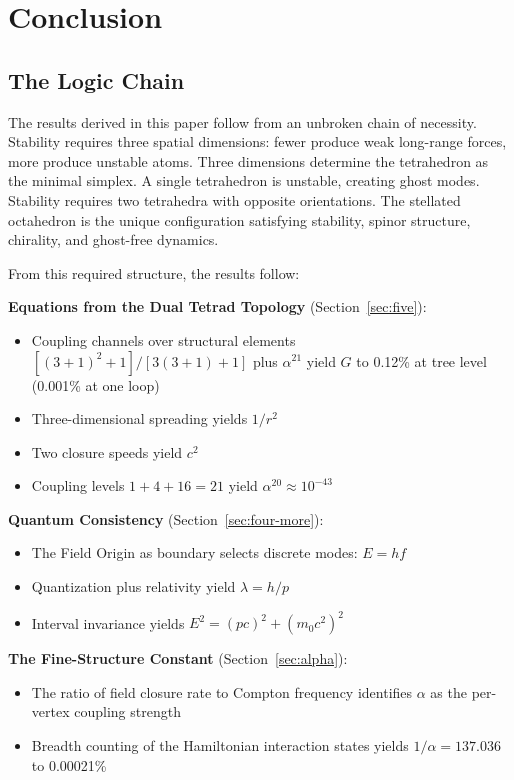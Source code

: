 \documentclass[aps,prd,preprint,superscriptaddress,showpacs,preprintnumbers,amsmath,amssymb,nofootinbib]{revtex4-2}
\begin{document}
\section{Conclusion}
\label{sec:conclusion}

\subsection{The Logic Chain}
\label{subsec:chain}

The results derived in this paper follow from an unbroken chain of necessity. Stability requires three spatial dimensions: fewer produce weak long-range forces, more produce unstable atoms. Three dimensions determine the tetrahedron as the minimal simplex. A single tetrahedron is unstable, creating ghost modes. Stability requires two tetrahedra with opposite orientations. The stellated octahedron is the unique configuration satisfying stability, spinor structure, chirality, and ghost-free dynamics.

From this required structure, the results follow:

\textbf{Equations from the Dual Tetrad Topology} (Section~\ref{sec:five}):
\begin{itemize}
\item Coupling channels over structural elements $[(3+1)^2+1]/[3(3+1)+1]$ plus $\alpha^{21}$ yield $G$ to 0.12\% at tree level (0.001\% at one loop)
\item Three-dimensional spreading yields $1/r^2$
\item Two closure speeds yield $c^2$
\item Coupling levels $1 + 4 + 16 = 21$ yield $\alpha^{20} \approx 10^{-43}$
\end{itemize}

\textbf{Quantum Consistency} (Section~\ref{sec:four-more}):
\begin{itemize}
\item The Field Origin as boundary selects discrete modes: $E = hf$
\item Quantization plus relativity yield $\lambda = h/p$
\item Interval invariance yields $E^2 = (pc)^2 + (m_0 c^2)^2$
\end{itemize}

\textbf{The Fine-Structure Constant} (Section~\ref{sec:alpha}):
\begin{itemize}
\item The ratio of field closure rate to Compton frequency identifies $\alpha$ as the per-vertex coupling strength
\item Breadth counting of the Hamiltonian interaction states yields $1/\alpha = 137.036$ to 0.00021\%
\end{itemize}
\end{document}
